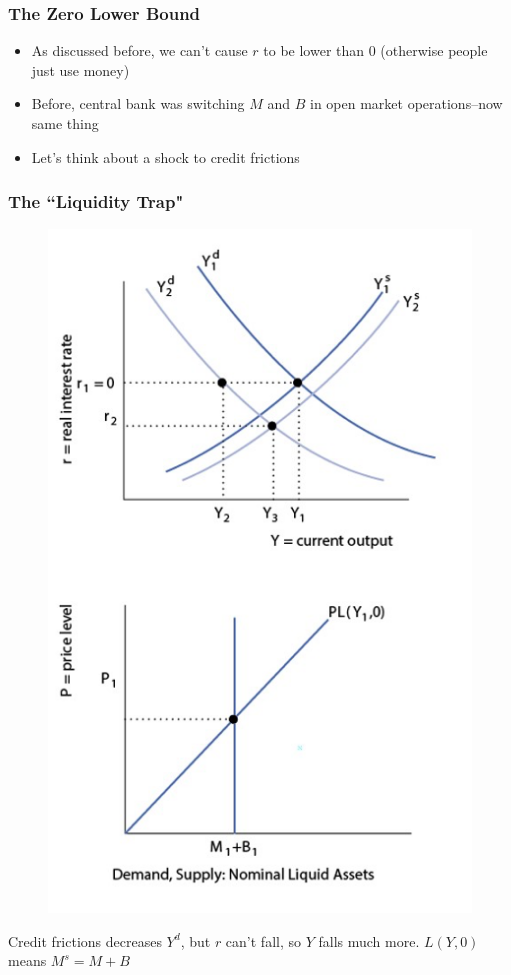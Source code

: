 \documentclass{beamer}
\begin{document}
\begin{frame}
\frametitle[alignment=center]{The Zero Lower Bound }
\begin{itemize}
\item As discussed before, we can't cause $r$ to be lower than 0 (otherwise people just use money)
\bigskip
\item Before, central bank was switching $M$ and $B$ in open market operations--now same thing
\bigskip
\item Let's think about a shock to credit frictions
\end{itemize}
\end{frame}


\begin{frame}
\frametitle[alignment=center]{The ``Liquidity Trap"}
\begin{figure}
\centering
\includegraphics[scale=0.62]{Figures/W_Fig_14pt6.png}
\end{figure}
Credit frictions decreases $Y^d$, but $r$ can't fall, so $Y$ falls much more. $L(Y,0)$ means $M^s=M+B$
\end{frame}
\end{document}
